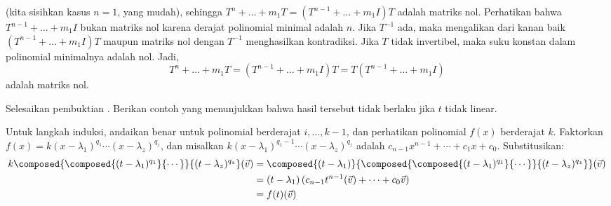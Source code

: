 \begin{exercises}
\begin{answer}
\begin{exparts}
         (kita sisihkan kasus \( n=1 \), yang mudah), sehingga
         \( T^n+\dots+m_1T=(T^{n-1}+\dots+m_1I)T \) adalah matriks nol.
         Perhatikan bahwa \( T^{n-1}+\dots+m_1I \) bukan matriks nol karena
         derajat polinomial minimal adalah \( n \).
         Jika \( T^{-1} \) ada, maka mengalikan dari kanan baik
         \( (T^{n-1}+\dots+m_1I)T \) maupun matriks nol
         dengan $T^{-1}$ menghasilkan kontradiksi.
       \partsitem Jika \( T \) tidak invertibel, maka suku konstan dalam
         polinomial minimalnya adalah nol.
         Jadi,
         \begin{equation*}
            T^n+\dots+m_1T=(T^{n-1}+\dots+m_1I)T=T(T^{n-1}+\dots+m_1I)
         \end{equation*}
         adalah matriks nol.
       \end{exparts} 
     \end{answer}
   \recommended \item \label{exer:PolyMapsFactor}
      \begin{exparts}
        \partsitem Selesaikan pembuktian .
        \partsitem Berikan contoh yang menunjukkan bahwa hasil tersebut tidak berlaku
          jika $t$ tidak linear.
      \end{exparts}
      \begin{answer}
        \begin{exparts}
          \partsitem
            Untuk langkah induksi, andaikan 
            benar untuk polinomial
            berderajat \( i,\ldots,k-1 \), dan perhatikan polinomial \( f(x) \)
            berderajat \( k \).
            Faktorkan $f(x)=k(x-\lambda_1)^{q_1}\cdots(x-\lambda_z)^{q_z}$,
            dan misalkan
            \( k(x-\lambda_1)^{q_1-1}\cdots(x-\lambda_z)^{q_z} \)
            adalah \( c_{n-1}x^{n-1}+\cdots+c_1x+c_0 \).
            Substitusikan:
            \begin{align*}
               k\composed{\composed{(t-\lambda_1)^{q_1}}{\cdots}}{
                                            (t-\lambda_z)^{q_z}}(\vec{v})
               &=
               \composed{(t-\lambda_1)}{
                  \composed{\composed{(t-\lambda_1)^{q_1}}{\cdots}}{
                  (t-\lambda_z)^{q_z}} }
                          (\vec{v})    \\
               &=
               (t-\lambda_1)\,(c_{n-1}t^{n-1}(\vec{v})+\cdots+c_0\vec{v}) \\
               &=
               f(t)(\vec{v})
            \end{align*}

\end{exparts}
\end{answer}
\end{exercises}
